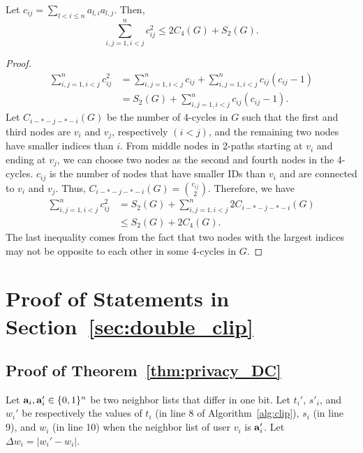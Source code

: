 {\begin{lemma}
  \label{lem:c_ij_4cycle_2star}
  Let $c_{ij} = \sum_{l < i \leq n} a_{l,i} a_{l,j}$. Then,
\[
    \sum_{i,j=1, i<j}^n c_{ij}^2 \leq 2 C_4(G) + S_2(G).
\]
\end{lemma}
\begin{proof}
  \begin{align*}
      \sum_{i,j=1, i<j}^n c_{ij}^2
      &= \sum_{i,j=1, i<j}^n c_{ij} + \sum_{i,j=1, i<j}^n c_{ij}(c_{ij}-1) \\
      &= S_2(G) + \sum_{i,j=1, i<j}^n c_{ij}(c_{ij}-1).
  \end{align*}
  Let $C_{i-*-j-*-i}(G)$ be the number of 4-cycles in $G$
  such that the first and third nodes are $v_i$ and $v_j$, respectively $(i<j)$, and the remaining two nodes have smaller indices than $i$.
  From middle nodes in 2-paths starting at $v_i$ and ending at $v_j$, we can choose two nodes as the second and fourth nodes in the 4-cycles.
  $c_{ij}$ is the number of nodes that have smaller IDs than $v_i$ and are connected to $v_i$ and $v_j$.
  Thus,
  $C_{i-*-j-*-i}(G) = \binom{c_{ij}}{2}$.
  Therefore, we have
  \begin{align*}
      \sum_{i,j=1, i<j}^n c_{ij}^2
       &= S_2(G) + \sum_{i,j=1, i<j}^n 2C_{i-*-j-*-i}(G) \\
      &\leq S_2(G) + 2 C_4(G).
  \end{align*}
The last inequality comes from the fact that
two nodes with the largest indices may not be opposite to each other in some 4-cycles in $G$.
\end{proof}

\section{Proof of Statements in Section~\ref{sec:double_clip}}
\label{sec:proof_double_clip}
\subsection{Proof of Theorem~\ref{thm:privacy_DC}}

Let $\mathbf{a}_i, \mathbf{a}'_i \in \{0,1\}^n$ be two neighbor lists that differ in one bit.
Let ${t_i}'$, $s'_i$, and ${w_i}'$ be respectively the values of $t_i$ (in line 8 of Algorithm~\ref{alg:clip}), $s_i$ (in line 9), and $w_i$ (in line 10) when the neighbor list of user $v_i$ is $\mathbf{a}'_i$.
Let $\Delta w_i = |{w_i}' - w_i|$.

}
